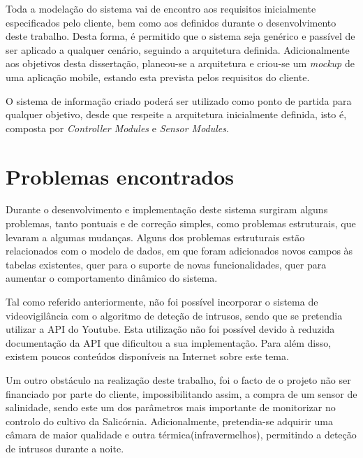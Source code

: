 Toda a modelação do sistema vai de encontro aos requisitos inicialmente especificados pelo cliente, bem como aos definidos durante o desenvolvimento deste trabalho. Desta forma, é permitido que o sistema seja genérico e passível de ser aplicado a qualquer cenário, seguindo a arquitetura definida. Adicionalmente aos objetivos desta dissertação, planeou-se a arquitetura e criou-se um \textit{mockup} de uma aplicação mobile, estando esta prevista pelos requisitos do cliente. 


O sistema de informação criado poderá ser utilizado como ponto de partida para qualquer objetivo, desde que respeite a arquitetura inicialmente definida, isto é, composta por \textit{Controller Modules} e \textit{Sensor Modules}. 



\section{Problemas encontrados}


Durante o desenvolvimento e implementação deste sistema surgiram alguns problemas, tanto pontuais e de correção simples, como
problemas estruturais, que levaram a algumas mudanças. Alguns dos problemas estruturais estão relacionados com o modelo de dados, em que foram adicionados novos campos às tabelas existentes, quer para o suporte de novas funcionalidades, quer para aumentar o comportamento dinâmico do sistema.

Tal como referido anteriormente, não foi possível incorporar o sistema de videovigilância com o algoritmo de deteção de intrusos, sendo que se pretendia utilizar a \ac{API} do Youtube. Esta utilização não foi possível devido à reduzida documentação da API que dificultou a sua implementação. Para além disso, existem poucos conteúdos disponíveis na Internet sobre este tema. 




Um outro obstáculo na realização deste trabalho, foi o facto de o projeto não ser financiado por parte do cliente, impossibilitando assim, a compra de um sensor de salinidade, sendo este um dos parâmetros mais importante de monitorizar no controlo do cultivo da Salicórnia. Adicionalmente, pretendia-se adquirir uma câmara de maior qualidade e outra térmica(infravermelhos), permitindo a deteção de intrusos durante a noite. 






